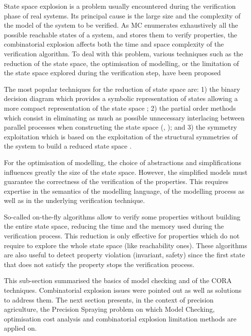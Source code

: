 \documentclass[preprint,3p,times,twocolumn]{elsarticle}
\begin{document}
State space explosion is a problem usually encountered during the verification phase of real systems. Its principal cause is the large size and the complexity of the model of the system to be verified. As MC enumerates exhaustively all the possible reachable states of a system, and stores them to verify properties, the combinatorial explosion affects both the time and space complexity of the verification algorithm. To deal with this problem, various techniques such as the reduction of the state space, the optimisation of modelling, or the limitation of the state space explored during the verification step, have been proposed

The most popular techniques for the reduction of state space are: 1) the binary decision diagram which provides a symbolic representation of states allowing a more compact representation of the state space \cite{burch1992symbolic}; 2) the partial order methods which consist in eliminating as much as possible unnecessary interlacing between parallel processes when constructing the state space (\cite{godefroid1996partial}, \cite{boucheneb2009covering}); and 3) the symmetry exploitation which is based on the exploitation of the structural symmetries of the system to build a reduced state space \cite{hendriks2003adding}.

For the optimisation of modelling, the choice of abstractions and simplifications influences greatly the size of the state space. However, the simplified models must guarantee the correctness of the verification of the properties. This requires expertise in the semantics of the modelling language, of the modelling process as well as in the underlying verification technique.

So-called on-the-fly algorithms allow to verify some properties without building the entire state space, reducing the time and the memory used during the verification process. This reduction is only effective for properties which do not require to explore the whole state space (like reachability ones). These algorithms are also useful to detect property violation (invariant, safety) since the first state that does not satisfy the property stops the verification process.

This sub-section summarised the basics of model checking and of the CORA techniques. Combinatorial explosion issues were pointed out as well as solutions to address them. 
The next section presents, in the context of precision agriculture, the Precision Spraying problem on which Model Checking, optimisation cost analysis and combinatorial explosion limitation methods are applied on.
\end{document}
